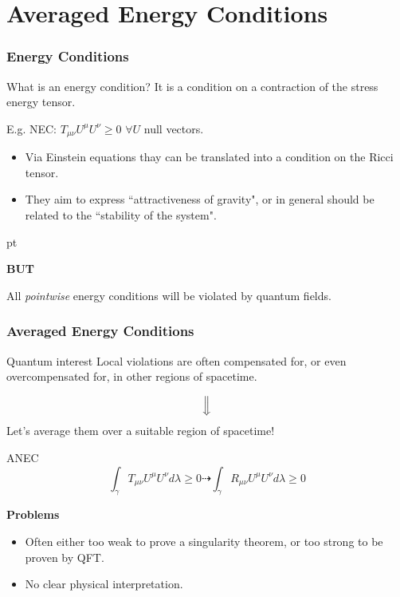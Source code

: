 \documentclass[handout]{beamer}
\begin{document}
	\section{Averaged Energy Conditions}
	\begin{frame}
		\frametitle{Energy Conditions}
		\begin{defblock}{What is an energy condition?}
			It is a condition on a contraction of the stress energy tensor.

			E.g. NEC: \(T_{\mu\nu}U^{\mu}U^{\nu} \ge 0\)  \(\forall U\) null vectors.
		\end{defblock}
		\begin{itemize}
			\item Via Einstein equations thay can be translated into a condition on the Ricci tensor.
			\item They aim to express ``attractiveness of gravity", or in general should be related to the ``stability of the system".
		\end{itemize}
		 pt 
		\begin{center}
			\textbf{BUT}
		\end{center}
		\begin{ideablock}{}
			\centering
			All \emph{pointwise} energy conditions will be violated by quantum fields.%
		\end{ideablock}
	\end{frame}

	\begin{frame}
		\frametitle{Averaged Energy Conditions}
		\begin{ideablock}{Quantum interest}
			\centering
			Local violations are often compensated for, or even overcompensated for, in other regions of spacetime.
		\end{ideablock}
		\[
			\Big\Downarrow
		\]
		  Let's average them over a suitable region of spacetime! \emoji{light-bulb} 
		\begin{defblock}{ANEC}
			\[
				\int_{\gamma} T_{\mu\nu}U^{\mu}U^{\nu} d\lambda \ge 0 \dashrightarrow \int_{\gamma}  R_{\mu\nu}U^{\mu}U^{\nu} d\lambda \ge 0
			\]
		\end{defblock}
		\textbf{Problems}
		\begin{itemize}
			\item Often either too weak to prove a singularity theorem, or too strong to be proven by QFT.
			\item No clear physical interpretation.
		\end{itemize}
	\end{frame}
\end{document}
